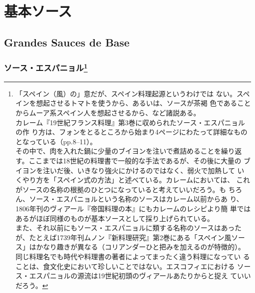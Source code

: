 \documentclass[twoside,12Q,b5j]{escoffierltjsbook}
\date{}
\renewcommand{\thechapter}{}
\renewcommand{\thesection}{}
\begin{document}







\section{基本ソース}\label{ux57faux672cux30bdux30fcux30b9}

\subsection{Grandes Sauces de Base}\label{grandes-sauces-de-base}

\vspace*{1.7\zw}

\subsubsection[ソース・エスパニョル]{\texorpdfstring{ソース・エスパニョル\footnote{「スペイン（風）の」意だが、スペイン料理起源というわけでは
  ない。スペインを想起させるトマトを使うから、あるいは、ソースが茶褐
  色であることからムーア系スペイン人を想起させるから、など諸説ある。\\
  カレーム『19世紀フランス料理』第3巻に収められたソース・エスパニョルの作
  り方は、フォンをとるところから始まり4ページにわたって詳細なものとなっている（pp.8–11）。\\
  その中で、肉を入れた鍋に少量のブイヨンを注いで煮詰めることを繰り返
  す。ここまでは18世紀の料理書で一般的な手法であるが、その後に大量の
  ブイヨンを注いだ後、いきなり強火にかけるのではなく、弱火で加熱して
  いくやり方を「スペイン式の方法」と述べている。カレームにおいては、
  これがソースの名称の根拠のひとつになっていると考えていいだろう。も
  ちろん、ソース・エスパニョルという名称のソースはカレーム以前からあ
  り、1806年刊のヴィアール『帝国料理の本』にもカレームのレシピより簡
  単ではあるがほぼ同様のものが基本ソースとして採り上げられている。\\
  また、それ以前にもソース・エスパニョルに類する名称のソースはあった
  が、たとえば1739年刊ムノン『新料理研究』第2巻にある「スペイン風ソー
  ス」はかなり趣きが異なる（コリアンダーひと把みを加えるのが特徴的）。
  同じ料理名でも時代や料理書の著者によってまったく違う料理になってい
  ることは、食文化史において珍しいことではない。エスコフィエにおける
  ソース・エスパニョルの源流は19世紀初頭のヴィアールあたりからと捉え
  ていいだろう。}}{ソース・エスパニョル}}\label{ux30bdux30fcux30b9ux30a8ux30b9ux30d1ux30cbux30e7ux30eb102008}
\end{document}
